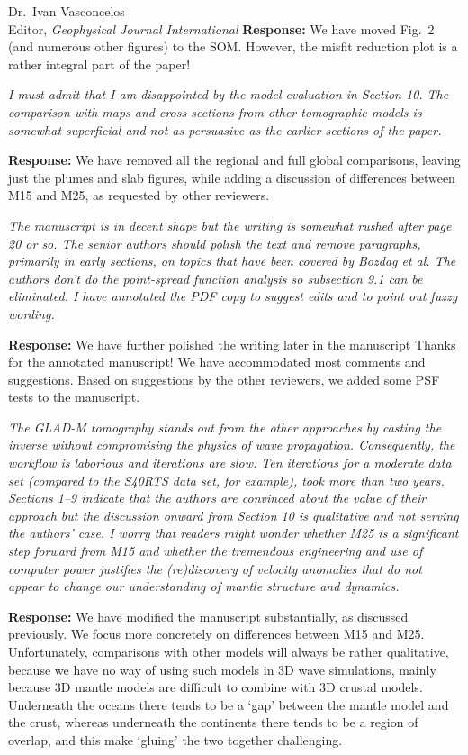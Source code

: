 \documentclass[11pt,a4paper]{letter}
\newcommand{\response}[1]{\textbf{Response:} #1}
\newcommand{\rev}[1]{{\it{#1}}}
\begin{document}
\begin{letter}{Dr.~Ivan Vasconcelos\\
Editor, \textit{Geophysical Journal International}}
\response{We have moved Fig.~2 (and numerous other figures) to the SOM. However, the misfit reduction plot is a rather integral part of the paper!}

\rev{I must admit that I am disappointed by the model evaluation in Section 10. The comparison with maps and cross-sections from other tomographic models is somewhat superficial and not as persuasive as the earlier sections of the paper.
}

\response{We have removed all the regional and full global comparisons, leaving just the plumes and slab figures, while adding a discussion of differences between M15 and M25, as requested by other reviewers.}

\rev{The manuscript is in decent shape but the writing is somewhat rushed after page 20 or so. The senior authors should polish the text and remove paragraphs, primarily in early sections, on topics that have been covered by Bozdag et al.
The authors don't do the point-spread function analysis so subsection 9.1 can be eliminated. I have annotated the PDF copy to suggest edits and to point out fuzzy wording.
}

\response{We have further polished the writing later in the manuscript
Thanks for the annotated manuscript! We have accommodated most comments and suggestions.
Based on suggestions by the other reviewers,
we added some PSF tests to the manuscript.}

\rev{The GLAD-M tomography stands out from the other approaches by casting the inverse without compromising the physics of wave propagation. Consequently, the workflow is laborious and iterations are slow. Ten iterations for a moderate data set (compared to the S40RTS data set, for example), took more than two years. Sections 1--9 indicate that the authors are convinced about the value of their approach but the discussion onward from Section 10 is qualitative and not serving the authors' case.
I worry that readers might wonder whether M25 is a significant step forward from M15 and whether the tremendous engineering and use of computer power justifies the (re)discovery of velocity anomalies that do not appear to change our understanding of mantle structure and dynamics.
}

\response{We have modified the manuscript substantially, as discussed previously. We focus more concretely on differences between M15 and M25.
Unfortunately,
comparisons with other models will always be rather qualitative, because we have no way of using such models in 3D wave simulations, mainly because 3D mantle models are difficult to combine with 3D crustal models. Underneath the oceans there tends to be a `gap' between the mantle model and the crust, whereas underneath the continents there tends to be a region of overlap, and this make `gluing' the two together challenging.}


\end{letter}
\end{document}
